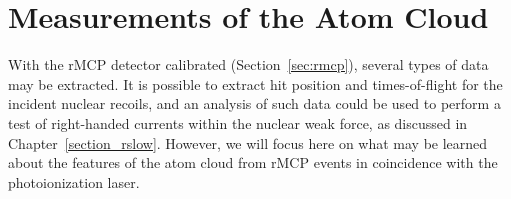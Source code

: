 




\section{Measurements of the Atom Cloud}
\label{sec:cloud_calibration}
With the rMCP detector calibrated (Section~\ref{sec:rmcp}), several types of data may be extracted.  It is possible to extract hit position and times-of-flight for the incident nuclear recoils, and an analysis of such data could be used to perform a test of right-handed currents within the nuclear weak force, as discussed in Chapter~\ref{section_rslow}.  However, we will focus here on what may be learned about the features of the atom cloud from rMCP events in coincidence with the photoionization laser.~


